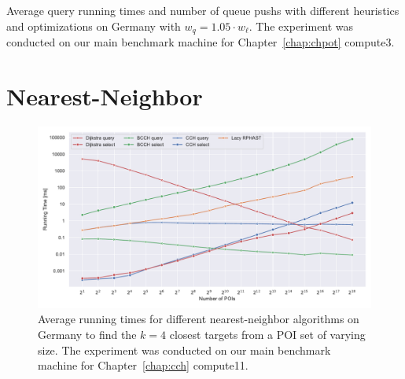\documentclass[a4paper, english, cleveref]{lipics-v2021}
\begin{document}
\begin{table}
\setlength{\tabcolsep}{3pt}
\centering
\caption{
Average query running times and number of queue pushs with different heuristics and optimizations on Germany with $w_q = 1.05 \cdot w_\ell$.
The experiment was conducted on our main benchmark machine for Chapter~\ref{chap:chpot} compute3.
}\label{tab:cchpot_opts}

\end{table}

\section{Nearest-Neighbor}

\begin{figure}
\centering
\includegraphics[width=\linewidth]{fig/knn_ger.pdf}
\caption{
Average running times for different nearest-neighbor algorithms on Germany to find the $k=4$ closest targets from a POI set of varying size.
The experiment was conducted on our main benchmark machine for Chapter~\ref{chap:cch} compute11.
}\label{fig:knn_ger}
\end{figure}

\begin{table}
\setlength{\tabcolsep}{3pt}
\centering
\caption{
Overview over the performance of various $k$-nearest-neighbor algorithms for different target distributions.
The experiment was conducted on the same benchmark machine used in ~\cite{TODO}. %
For each distribution, we report the time to index a set of POIs (selection time), the space consumed by the index (selection space), and the time to find the $k =$ 1, 4, 8 closest POIs (query time).
For CRP we list unscaled results as reported in \cite{TODO}.
}\label{tab:knn_overview_table}

\end{table}
\end{document}
